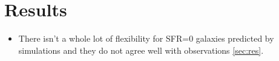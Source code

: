 \section{Results} \label{sec:results}

\begin{itemize}
\item There isn't a whole lot of flexibility for SFR=0 galaxies predicted by
simulations and they do not agree well with observations \ref{sec:res}. 
\end{itemize}
